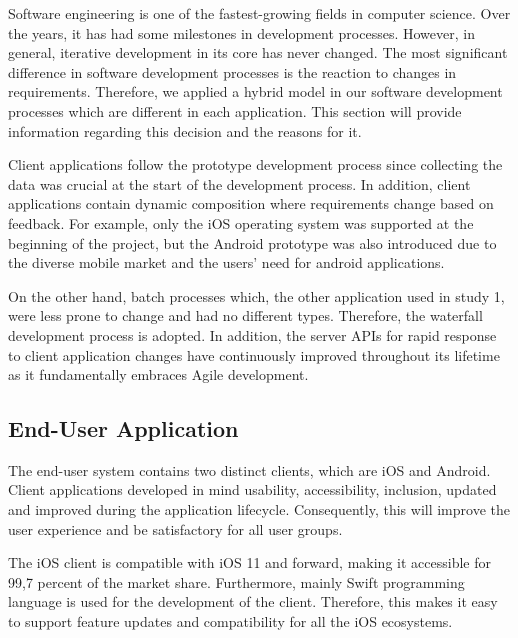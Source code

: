Software engineering is one of the fastest-growing fields in computer science. Over the years, it has had some milestones in development processes. However, in general, iterative development in its core has never changed. The most significant difference in software development processes is the reaction to changes in requirements. Therefore, we applied a hybrid model in our software development processes which are different in each application. This section will provide information regarding this decision and the reasons for it.

Client applications follow the prototype development process since collecting the data was crucial at the start of the development process. In addition, client applications contain dynamic composition where requirements change based on feedback. For example, only the iOS operating system was supported at the beginning of the project, but the Android prototype was also introduced due to the diverse mobile market and the users' need for android applications.

On the other hand, batch processes which, the other application used in study 1, were less prone to change and had no different types. Therefore, the waterfall development process is adopted. In addition, the server APIs for rapid response to client application changes have continuously improved throughout its lifetime as it fundamentally embraces Agile development.

\subsection{End-User Application}

The end-user system contains two distinct clients, which are iOS and Android. Client applications developed in mind usability, accessibility, inclusion, updated and improved during the application lifecycle. Consequently, this will improve the user experience and be satisfactory for all user groups.

The iOS client is compatible with iOS 11 and forward, making it accessible for 99,7 percent of the market share. Furthermore, mainly Swift programming language is used for the development of the client. Therefore, this makes it easy to support feature updates and compatibility for all the iOS ecosystems. 

